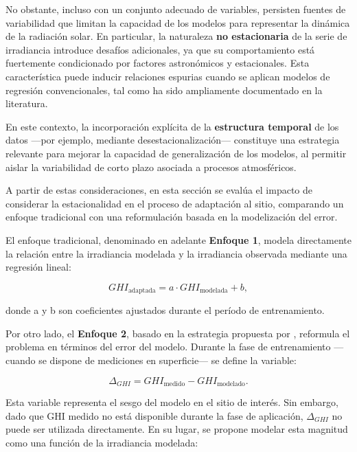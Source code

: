 No obstante, incluso con un conjunto adecuado de variables, persisten fuentes de variabilidad que limitan la capacidad de los modelos para representar la dinámica de la radiación solar. En particular, la naturaleza \textbf{no estacionaria} de la serie de irradiancia introduce desafíos adicionales, ya que su comportamiento está fuertemente condicionado por factores astronómicos y estacionales. Esta característica puede inducir relaciones espurias cuando se aplican modelos de regresión convencionales, tal como ha sido ampliamente documentado en la literatura.

En este contexto, la incorporación explícita de la \textbf{estructura temporal} de los datos —por ejemplo, mediante desestacionalización— constituye una estrategia relevante para mejorar la capacidad de generalización de los modelos, al permitir aislar la variabilidad de corto plazo asociada a procesos atmosféricos.

A partir de estas consideraciones, en esta sección se evalúa el impacto de considerar la estacionalidad en el proceso de adaptación al sitio, comparando un enfoque tradicional con una reformulación basada en la modelización del error.

El enfoque tradicional, denominado en adelante \textbf{Enfoque 1}, modela directamente la relación entre la irradiancia modelada y la irradiancia observada mediante una regresión lineal:

\begin{equation}
GHI_{\text{adaptada}} = a \cdot GHI_{\text{modelada}} + b,
\label{ec:approache1}
\end{equation}

\noindent donde a y b son coeficientes ajustados durante el período de entrenamiento.

Por otro lado, el \textbf{Enfoque 2}, basado en la estrategia propuesta por \cite{SALAMALIKIS2022}, reformula el problema en términos del error del modelo. Durante la fase de entrenamiento —cuando se dispone de mediciones en superficie— se define la variable:

\begin{equation}
\Delta_{GHI} = GHI_{\text{medido}} - GHI_{\text{modelado}}.
\end{equation}

Esta variable representa el sesgo del modelo en el sitio de interés. Sin embargo, dado que GHI medido no está disponible durante la fase de aplicación, $\Delta_{GHI}$  no puede ser utilizada directamente. En su lugar, se propone modelar esta magnitud como una función de la irradiancia modelada:

